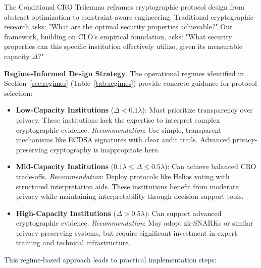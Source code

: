 \documentclass{ieeeaccess}
\begin{document}
The Conditional CRO Trilemma reframes cryptographic protocol design from abstract optimization to constraint-aware engineering. Traditional cryptographic research asks: "What are the optimal security properties achievable?" Our framework, building on CLO's empirical foundation, asks: "What security properties can this specific institution effectively utilize, given its measurable capacity $\Delta$?"

\textbf{Regime-Informed Design Strategy}. The operational regimes identified in Section~\ref{sec:regimes} (Table~\ref{tab:regimes}) provide concrete guidance for protocol selection:

\begin{itemize}
\item \textbf{Low-Capacity Institutions} ($\Delta < 0.1\lambda$): Must prioritize transparency over privacy. These institutions lack the expertise to interpret complex cryptographic evidence. \emph{Recommendation}: Use simple, transparent mechanisms like ECDSA signatures with clear audit trails. Advanced privacy-preserving cryptography is inappropriate here.

\item \textbf{Mid-Capacity Institutions} ($0.1\lambda \leq \Delta \leq 0.5\lambda$): Can achieve balanced CRO trade-offs. \emph{Recommendation}: Deploy protocols like Helios voting with structured interpretation aids. These institutions benefit from moderate privacy while maintaining interpretability through decision support tools.

\item \textbf{High-Capacity Institutions} ($\Delta > 0.5\lambda$): Can support advanced cryptographic evidence. \emph{Recommendation}: May adopt zk-SNARKs or similar privacy-preserving systems, but require significant investment in expert training and technical infrastructure.
\end{itemize}

This regime-based approach leads to practical implementation steps:
\end{document}
